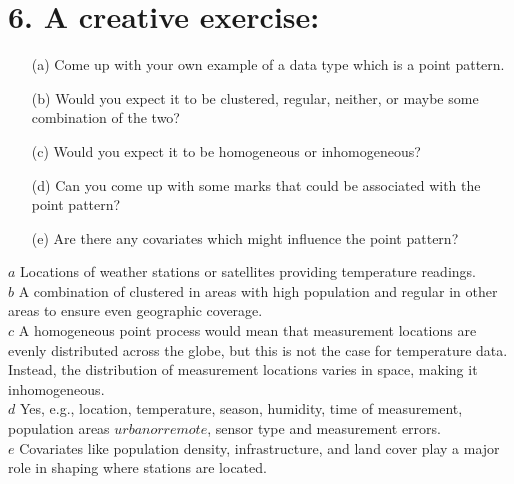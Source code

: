 \documentclass{article}
\begin{document}
\section*{6. A creative exercise:}
\begin{enumerate}
    \item[(a)] Come up with your own example of a data type which is a point pattern.
    
    \item[(b)] Would you expect it to be clustered, regular, neither, or maybe some combination of the two?
    
    \item[(c)] Would you expect it to be homogeneous or inhomogeneous?
    
    \item[(d)] Can you come up with some marks that could be associated with the point pattern?
    
    \item[(e)] Are there any covariates which might influence the point pattern?
\end{enumerate}
\(a\) Locations of weather stations or satellites providing temperature readings.\\
\(b\) A combination of clustered in areas with high population and regular in other areas to ensure even geographic coverage.\\
\(c\) A homogeneous point process would mean that measurement locations are evenly distributed across the globe, but this is not the case for temperature data. 
Instead, the distribution of measurement locations varies in space, making it inhomogeneous.\\
\(d\) Yes, e.g., location, temperature, season, humidity, time of measurement, population areas \(urban or remote\), sensor type and measurement errors.\\
\(e\) Covariates like population density, infrastructure, and land cover play a major role in shaping where stations are located.
\end{document}
